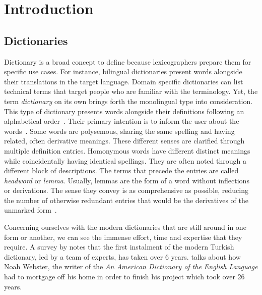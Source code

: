 \chapter{Introduction}\label{chap:introduction}%
\section{Dictionaries}%
\label{sec:dictionaries}
Dictionary is a broad concept to define because lexicographers prepare them for specific use cases.
For instance, bilingual dictionaries present words alongside their translations in the target language.
Domain specific dictionaries can list technical terms that target people who are familiar with the terminology.
Yet, the term \emph{dictionary} on its own brings forth the monolingual type into consideration.
This type of dictionary presents words alongside their definitions following an alphabetical order~\cite{sterkenburg_practical_2003}.
Their primary intention is to inform the user about the words~\cite{uzun_modern_2005}.
Some words are polysemous, sharing the same spelling and having related, often derivative meanings.
These different senses are clarified through multiple definition entries.
Homonymous words have different distinct meanings while coincidentally having identical spellings.
They are often noted through a different block of descriptions.
The terms that precede the entries are called \emph{headword} or \emph{lemma}.
Usually, lemmas are the form of a word without inflections or derivations.
The sense they convey is as comprehensive as possible, reducing the number of otherwise redundant entries that would be the derivatives of the unmarked form~\cite{ibrahim_usta_turkce_2006}.

Concerning ourselves with the modern dictionaries that are still around in one form or another, we can see the immense effort, time and expertise that they require.
A survey by \textcite{uzun_1945ten_1999} notes that the first instalment of the modern Turkish dictionary, led by a team of experts, has taken over 6 years.
\textcite{kendall_forgotten_2011} talks about how Noah Webster, the writer of the \emph{An American Dictionary of the English Language} had to mortgage off his home in order to finish his project which took over 26 years.

